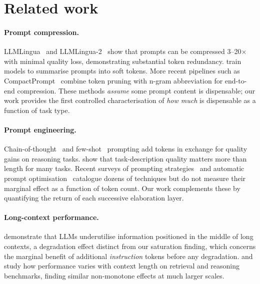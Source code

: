 \section{Related work}
\label{sec:related}

\paragraph{Prompt compression.}
LLMLingua~\citep{jiang2023llmlingua} and LLMLingua-2~\citep{pan2024llmlingua2}
show that prompts can be compressed 3--20$\times$ with minimal quality loss,
demonstrating substantial token redundancy.
\citet{chevalier2023autocompressors} train models to summarise prompts into
soft tokens.
More recent pipelines such as CompactPrompt~\citep{wang2025compactprompt}
combine token pruning with n-gram abbreviation for end-to-end compression.
These methods \emph{assume} some prompt content is dispensable; our work
provides the first controlled characterisation of \emph{how much} is
dispensable as a function of task type.

\paragraph{Prompt engineering.}
Chain-of-thought~\citep{wei2022cot} and few-shot~\citep{brown2020gpt3}
prompting add tokens in exchange for quality gains on reasoning tasks.
\citet{zhou2022large} show that task-description quality matters more than
length for many tasks.
Recent surveys of prompting strategies~\citep{sahoo2024systematic,
schulhoff2024prompt} and automatic prompt
optimisation~\citep{amatriain2025survey} catalogue dozens of techniques but
do not measure their marginal effect as a function of token count.
Our work complements these by quantifying the return of each successive
elaboration layer.

\paragraph{Long-context performance.}
\citet{liu2023lost} demonstrate that LLMs underutilise information positioned
in the middle of long contexts, a degradation effect distinct from our
saturation finding, which concerns the marginal benefit of additional
\emph{instruction} tokens before any degradation.
\citet{levy2024same} and \citet{hsieh2024ruler} study how performance varies
with context length on retrieval and reasoning benchmarks, finding similar
non-monotone effects at much larger scales.

